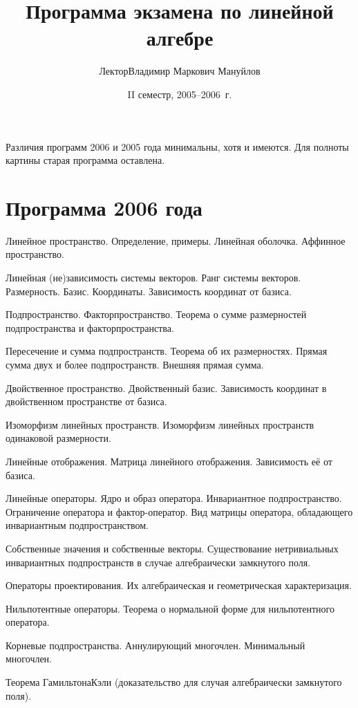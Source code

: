 \documentclass[a4paper]{article}
\title{Программа экзамена по линейной алгебре}
\author{Лектор\т Владимир Маркович Мануйлов}
\date{II семестр, 2005--2006~г.}
\begin{document}
\maketitle

\centerline{\scriptsize Различия программ 2006 и 2005 года минимальны, хотя и имеются. Для полноты картины старая программа оставлена.}

\section*{Программа 2006 года}

\begin{nums}{-2}
\item Линейное пространство. Определение, примеры. Линейная оболочка. Аффинное пространство.
\item Линейная (не)зависимость системы векторов. Ранг системы векторов. Размерность. Базис. Координаты.
Зависимость координат от базиса.
\item Подпространство. Факторпространство. Теорема о сумме размерностей подпространства и факторпространства.
\item Пересечение и сумма подпространств. Теорема об их размерностях. Прямая сумма двух и более подпространств.
Внешняя прямая сумма.
\item Двойственное пространство. Двойственный базис. Зависимость
координат в двойственном пространстве от базиса.
\item Изоморфизм линейных пространств. Изоморфизм линейных пространств одинаковой размерности.
\item Линейные отображения. Матрица линейного отображения. Зависимость её от базиса.
\item Линейные операторы. Ядро и образ оператора. Инвариантное
подпространство. Ограничение оператора и фактор-оператор. Вид
матрицы оператора, обладающего инвариантным подпространством.
\item Собственные значения и собственные векторы. Существование нетривиальных инвариантных
подпрос\-транств в случае алгебраически замкнутого поля.
\item Операторы проектирования. Их алгебраическая и геометрическая характеризация.
\item Нильпотентные операторы. Теорема о нормальной форме для нильпотентного оператора.
\item Корневые подпространства. Аннулирующий многочлен. Минимальный многочлен.
\item Теорема Гамильтона\ч Кэли (доказательство для случая алгебраически замкнутого поля).

\end{nums}
\end{document}
